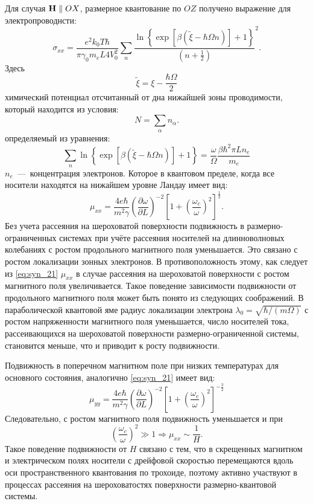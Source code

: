 Для случая $\boldsymbol{\mathbf{H}} \parallel OX$, размерное квантование по $OZ$ получено выражение для электропроводнсти:
\begin{equation} \label{eq:syn_18}
\sigma_{xx} = \frac{e^2 k_0 T \hbar}{\pi \gamma_0 m_e L 4 V^2_0} \sum_n{\frac{\ln{\left\{\exp{\left[\beta \left(\widetilde{\xi}-\hbar \Omega n\right)\right]}+1\right\}}}{\left(n+\frac{1}{2}\right)}^2}. 
\end{equation}
Здесь
\[
\widetilde{\xi} = \xi -\frac{\hbar\Omega }{2}
\]
химический потенциал отсчитанный от дна нижайшей зоны проводимости, который находится из условия:
\begin{equation} \label{eq:syn_19}
N=\sum_{\alpha }{n_{\alpha}}.
\end{equation}
определяемый из уравнения:
\begin{equation} \label{eq:syn_20}
\sum_n{\ln{\left\{\exp{\left[\beta \left(\widetilde{\xi}-\hbar \Omega n\right)\right]}+1\right\}}}=\frac{\omega }{\Omega } \frac{\beta \hbar^2 \pi L n_e}{m_e}
\end{equation}
$n_e$~---~концентрация электронов.
Которое в квантовом пределе, когда все носители находятся на нижайшем уровне Ландау имеет вид:
\begin{equation} \label{eq:syn_21}
\mu _{xx} =\frac{4e\hbar }{m^2 \gamma } \left(\frac{\partial \omega }{\partial L} \right)^{-2} \left[1+\left(\frac{\omega_c}{\omega } \right)^2 \right]^{\frac{1}{2} }.
\end{equation}
Без учета рассеяния на шероховатой поверхности подвижность в размерно-ограниченных системах при учёте рассеяния носителей на длинноволновых колебаниях с ростом продольного магнитного поля уменьшается. Это связано с ростом локализации зонных электронов. В противоположность этому, как следует из \eqref{eq:syn_21} $\mu_{xx} $ в случае рассеяния на шероховатой поверхности с ростом магнитного поля увеличивается. Такое поведение зависимости подвижности от продольного магнитного поля может быть понято из следующих соображений. В параболической квантовой яме радиус локализации электрона $\lambda_0 =\sqrt{\hbar / (m\Omega) } $ с ростом напряженности магнитного поля уменьшается, число носителей тока, рассеивающихся на шероховатой поверхности размерно-ограниченной системы, становится меньше, что и приводит к росту подвижности.

Подвижность в поперечном магнитном поле при низких температурах для основного состояния, аналогично \eqref{eq:syn_21} имеет вид:
\begin{equation} \label{eq:syn_22}
\mu_{yy} =\frac{4e\hbar }{m^{2} \gamma } \left(\frac{\partial \omega }{\partial L} \right)^{-2} \left[1+\left(\frac{\omega _{c} }{\omega } \right)^{2} \right]^{-\frac{3}{2} }
\end{equation}
Следовательно, с ростом магнитного поля подвижность уменьшается и при
\[
\left(\frac{\omega_c}{\omega } \right)^2 \gg 1 \Rightarrow \mu_{xx} \sim \frac{1}{H} .
\]
Такое поведение подвижности от $H$ связано с тем, что в скрещенных магнитном и электрическом полях носители с дрейфовой скоростью перемещаются вдоль оси пространственного квантования по трохоиде, поэтому активно участвуют в процессах рассеяния на шероховатостях поверхности размерно-квантовой системы. 

